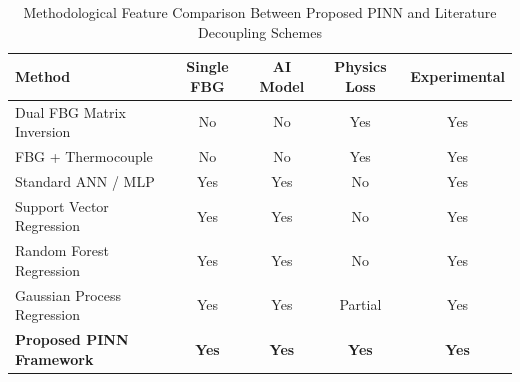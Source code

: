 \begin{table}[h]
\centering
\caption{Methodological Feature Comparison Between Proposed PINN and Literature Decoupling Schemes}
\label{tab:literature_comparison}
\begin{tabular}{lcccc}
\hline
\textbf{Method} & \textbf{Single FBG} & \textbf{AI Model} & \textbf{Physics Loss} & \textbf{Experimental} \\ \hline
Dual FBG Matrix Inversion & No & No & Yes & Yes \\
FBG + Thermocouple & No & No & Yes & Yes \\
Standard ANN / MLP & Yes & Yes & No & Yes \\
Support Vector Regression & Yes & Yes & No & Yes \\
Random Forest Regression & Yes & Yes & No & Yes \\
Gaussian Process Regression & Yes & Yes & Partial & Yes \\
\textbf{Proposed PINN Framework} & \textbf{Yes} & \textbf{Yes} & \textbf{Yes} & \textbf{Yes} \\ \hline
\end{tabular}
\end{table}